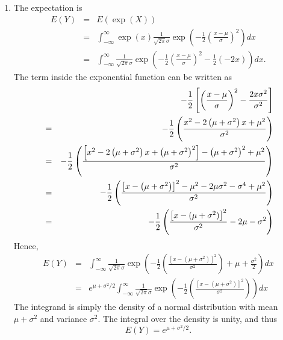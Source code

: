 \begin{Solution}{6.1}
\begin{enumerate}
\item The expectation is%
\begin{eqnarray*}
E(Y) &=&E\left( \exp \left( X\right) \right)  \\
&=&\int_{-\infty }^{\infty }\exp \left( x\right) \frac{1}{\sqrt{2\pi }\sigma
}\exp \left( -\frac{1}{2}\left( \frac{x-\mu }{\sigma }\right) ^{2}\right) dx
\\
&=&\int_{-\infty }^{\infty }\frac{1}{\sqrt{2\pi }\sigma }\exp \left( -\frac{1%
}{2}\left( \frac{x-\mu }{\sigma }\right) ^{2}-\frac{1}{2}\left( -2x\right)
\right) dx.
\end{eqnarray*}%
The term inside the exponential function can be written as%
\begin{eqnarray*}
&&-\frac{1}{2}\left[ \left( \frac{x-\mu }{\sigma }\right) ^{2}-\frac{%
2x\sigma ^{2}}{\sigma ^{2}}\right]  \\
&=&-\frac{1}{2}\left( \frac{x^{2}-2\left( \mu +\sigma ^{2}\right) x+\mu ^{2}%
}{\sigma ^{2}}\right)  \\
&=&-\frac{1}{2}\left( \frac{\left[ x^{2}-2\left( \mu +\sigma ^{2}\right)
x+\left( \mu +\sigma ^{2}\right) ^{2}\right] -\left( \mu +\sigma ^{2}\right)
^{2}+\mu ^{2}}{\sigma ^{2}}\right)  \\
&=&-\frac{1}{2}\left( \frac{\left[ x-\left( \mu +\sigma ^{2}\right)
\right]^2 -\mu^2 -2\mu \sigma ^{2}-\sigma ^{4}+\mu^2}{%
\sigma ^{2}}\right)  \\
&=&-\frac{1}{2}\left(\frac{\left[x-(\mu+\sigma^2)\right]^2}{\sigma^2} - 2\mu - \sigma^2 \right)
\end{eqnarray*}%
Hence,%
\begin{eqnarray*}
E(Y) &=&\int_{-\infty }^{\infty }\frac{1}{\sqrt{2\pi }\sigma }\exp \left( -%
\frac{1}{2}\left(\frac{\left[x-(\mu+\sigma^2)\right]^2}{\sigma^2}\right) + \mu +\frac{\sigma^2}{2} \right) dx \\
&=&e^{\mu +\sigma ^{2}/2}\int_{-\infty }^{\infty }\frac{1}{\sqrt{2\pi }%
\sigma }\exp \left( -\frac{1}{2}\left(\frac{\left[x-(\mu+\sigma^2)\right]^2}{\sigma^2}\right)\right)dx
\end{eqnarray*}%
The integrand is simply the density of a normal distribution with mean
$\mu +\sigma ^{2}$ and variance $\sigma ^{2}$. The integral over the
density is unity, and thus%
\begin{equation*}
E(Y)=e^{\mu +\sigma ^{2}/2}.
\end{equation*}


\end{enumerate}
\end{Solution}
